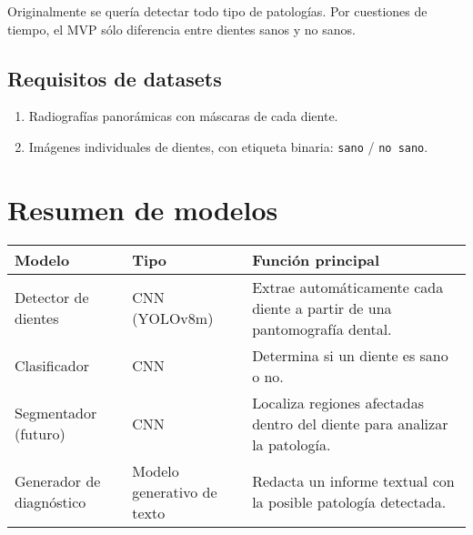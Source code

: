 \documentclass[a4paper,12pt]{article}
\begin{document}
Originalmente se quería detectar todo tipo de patologías. Por cuestiones de tiempo, el MVP sólo diferencia entre dientes sanos y no sanos.

\subsection*{Requisitos de datasets}

\begin{enumerate}
    \item Radiografías panorámicas con máscaras de cada diente.
    \item Imágenes individuales de dientes, con etiqueta binaria: \texttt{sano} / \texttt{no sano}.
\end{enumerate}

\section{Resumen de modelos}

\begin{center}
\begin{tabular}{|l|l|p{8cm}|}
\hline
\textbf{Modelo} & \textbf{Tipo} & \textbf{Función principal} \\
\hline
Detector de dientes & CNN (YOLOv8m) & Extrae automáticamente cada diente a partir de una pantomografía dental. \\
\hline
Clasificador & CNN & Determina si un diente es sano o no. \\
\hline
Segmentador (futuro) & CNN & Localiza regiones afectadas dentro del diente para analizar la patología. \\
\hline
Generador de diagnóstico & Modelo generativo de texto & Redacta un informe textual con la posible patología detectada. \\
\hline
\end{tabular}
\end{center}
\end{document}
